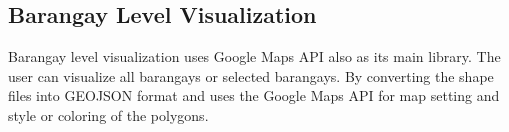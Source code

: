 \subsection{Barangay Level Visualization}
Barangay level visualization uses Google Maps API also as its main library. The user can visualize all barangays or selected barangays. By converting the shape files into GEOJSON format and uses the Google Maps API for map setting and style or coloring of the polygons. 

\clearpage